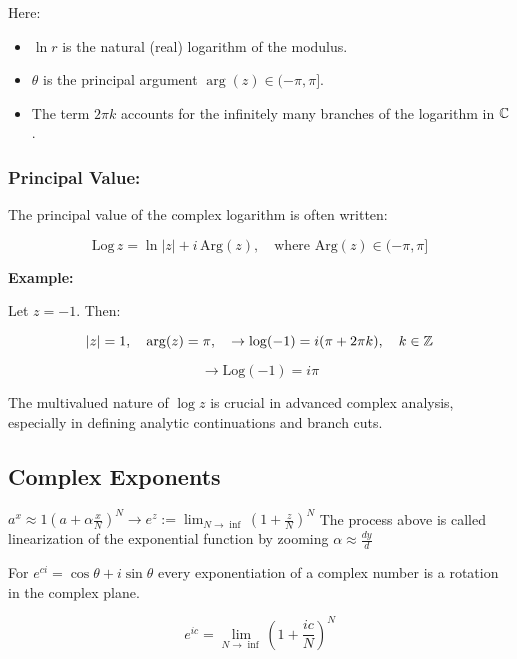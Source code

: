 Here:

\begin{itemize}
	
	\item \( \ln r \) is the natural (real) logarithm of the modulus.
	
	\item \( \theta \) is the principal argument \( \arg(z) \in (-\pi, \pi] \).
	
	\item The term \( 2\pi k \) accounts for the infinitely many branches of the logarithm in 
		  \( \mathbb{C} \).

		\end{itemize}

\subsubsection*{Principal Value:}

The principal value of the complex logarithm is often written:

\[
	\mathrm{Log}\,z = \ln |z| + i\,\mathrm{Arg}(z), \quad \text{where } \mathrm{Arg}(z) \in (-\pi, \pi]
\]

\textbf{Example:}
\vspace{\baselineskip}

Let \( z = -1 \). Then:

\[
	|z| = 1, \quad \arg(z) = \pi, \quad \to \log(-1) = i(\pi + 2\pi k), \quad k \in \mathbb{Z}
\]

\[
	\to \mathrm{Log}(-1) = i\pi
\]

The multivalued nature of \( \log z \) is crucial in advanced complex analysis, especially in defining 
analytic continuations and branch cuts.

\subsection{Complex Exponents}

\(a^x \approx 1 {\left(a + \alpha \frac{x}{N} \right)}^N \to e^z := \lim_{N \rightarrow \inf} 
{\left( 1 + \frac{z}{N}\right)}^N \) The process above is called linearization of the exponential 
function by zooming  \(\alpha \approx \frac{dy}{d}\)
\vspace{\baselineskip}

For  \(e^{ci} = \cos{\theta} + i\sin{\theta}\) every exponentiation of a complex number is a rotation 
in the complex plane.

\[
	e^{ic} = \lim_{N \to \inf} {\left( 1 + \frac{ic}{N}\right)}^N
\]

